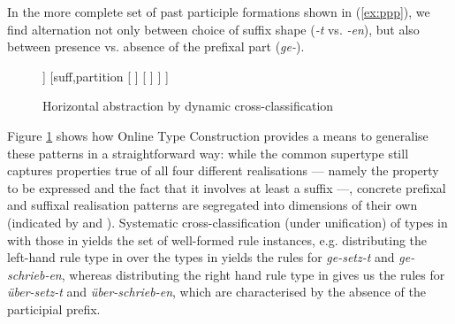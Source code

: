 \documentclass[output=paper
	        ,collection
	        ,collectionchapter
 	        ,biblatex
                ,babelshorthands
                ,newtxmath
                ,draftmode
                ,colorlinks, citecolor=brown
]{langscibook}
\begin{document}
\begin{exe}
\begin{xlist}
\begin{exe}
\begin{xlist}
In the more complete set of past participle formations shown in
(\ref{ex:ppp}), we find alternation not only between choice of suffix
shape (\textit{-t} vs. \textit{-en}), but also between presence
vs. absence of the prefixal part (\textit{ge-}).

\begin{figure}
  \centering
  \footnotesize
\begin{forest}
[%
\avmtmp{
	[mud &	\{[tam & ppp]\} \\
	mph & < \ldots\ , [pc & 1] > ]
}
	[pref,partition
		[%
		\avmtmp{
			[mph & <[ph & ge \\
					pc & -1], ![ ]!> ]
		}
		]
		[%
		\avmtmp{
			[mph & <![ ]!> ]
		}
		]
	]
	[suff,partition
		[%
		]
		[%
		]
	]
]
\end{forest}
  \caption{Horizontal abstraction by dynamic cross-classification}\label{fig:Horizontal}
\end{figure}

Figure \ref{fig:Horizontal} shows how Online Type Construction provides
a means to generalise these patterns in a straightforward way: while the
common supertype still captures properties true of all four different
realisations --- namely the property to be expressed and the fact that it
involves at least a suffix ---, concrete prefixal and suffixal realisation
patterns are segregated into dimensions of their own (indicated by
 and ). Systematic cross-classification
(under unification) of types in  with those in
 yields the set of well-formed rule instances,
e.g. distributing the left-hand rule type in  over the
types in  yields the rules for \textit{ge-setz-t} and
\textit{ge-schrieb-en}, whereas distributing the right hand rule type
in  gives us the rules for \textit{über-setz-t} and
\textit{über-schrieb-en}, which are characterised by the absence of
the participial prefix.


\end{xlist}
\end{exe}
\end{xlist}
\end{exe}
\end{document}
